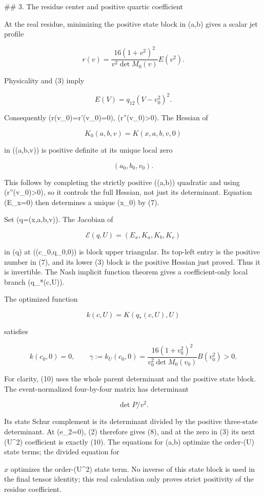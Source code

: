 ## 3. The residue center and positive quartic coefficient

At the real residue, minimizing the positive state block in (a,b) gives
a scalar jet profile

\[
r(v)=\frac{16(1+v^2)^2}{v^2\det M_0(v)}E(v^2).
\tag{8}
\]

Physicality and (3) imply

\[
E(V)=q_{12}(V-v_0^2)^2.
\]

Consequently (r(v_0)=r'(v_0)=0), (r''(v_0)>0). The Hessian of

\[
K_0(a,b,v)=K(x,a,b,v,0)
\]

in ((a,b,v)) is positive definite at its unique local zero

\[
(a_0,b_0,v_0).
\]

This follows by completing the strictly positive ((a,b)) quadratic and
using (r''(v_0)>0), so it controls the full Hessian, not just its
determinant. Equation (E_x=0) then determines a unique (x_0) by (7).

Set (q=(x,a,b,v)). The Jacobian of

\[
\mathcal E(q,U)=(E_x,K_a,K_b,K_v)
\tag{9}
\]

in (q) at ((c_0,q_0,0)) is block upper triangular. Its top-left entry is
the positive number in (7), and its lower (3) block is the positive
Hessian just proved. Thus it is invertible. The Nash implicit function
theorem gives a coefficient-only local branch (q_*(c,U)).

The optimized function

\[
k(c,U)=K(q_*(c,U),U)
\]

satisfies

\[
k(c_0,0)=0,\qquad
\gamma:=k_U(c_0,0)
=\frac{16(1+v_0^2)^2}{v_0^2\det M_0(v_0)}B(v_0^2)>0.
\tag{10}
\]

For clarity, (10) uses the whole parent determinant and the positive state
block. The event-normalized four-by-four matrix has determinant

\[
\det P/v^2.
\]

Its state Schur complement is its determinant divided by the positive
three-state determinant. At (e_2=0), (2) therefore gives (8), and at the
zero in (3) its next (U^2) coefficient is exactly (10). The equations
for (a,b) optimize the order-(U) state terms; the divided equation for

\(x\) optimizes the order-(U^2) state term. No inverse of this state block
is used in the final tensor identity; this real calculation only proves
strict positivity of the residue coefficient.


